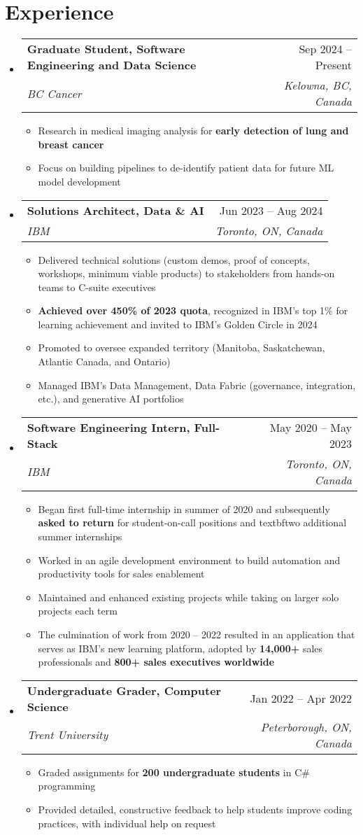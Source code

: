 \documentclass[letterpaper,11.5pt]{article}
\makeatletter
\newcommand{\resumeItem}[1]{
  \item\small{
    {#1 \vspace{-2pt}}
  }
}
\newcommand{\resumeSubheading}[4]{
  \vspace{-2pt}\item
    \begin{tabular*}{0.97\textwidth}[t]{l@{\extracolsep{\fill}}r}
      \textbf{#1} & #2 \\
      \textit{\small#3} & \textit{\small #4} \\
    \end{tabular*}\vspace{-7pt}
}
\newcommand{\resumeSubHeadingListStart}{\begin{itemize}[leftmargin=0.15in, label={}]}
\newcommand{\resumeSubHeadingListEnd}{\end{itemize}}
\newcommand{\resumeItemListStart}{\begin{itemize}}
\newcommand{\resumeItemListEnd}{\end{itemize}\vspace{-5pt}}
\makeatother
\begin{document}
\section{Experience}
  \resumeSubHeadingListStart
    \resumeSubheading
      {Graduate Student, Software Engineering and Data Science}{Sep 2024 -- Present}
      {BC Cancer}{Kelowna, BC, Canada}
      \resumeItemListStart
        \resumeItem{Research in medical imaging analysis for \textbf{early detection of lung and breast cancer}}
        \resumeItem{Focus on building pipelines to de-identify patient data for future ML model development}
      \resumeItemListEnd
    \resumeSubheading
      {Solutions Architect, Data \& AI}{Jun 2023 -- Aug 2024}
      {IBM}{Toronto, ON, Canada}
      \resumeItemListStart
        \resumeItem{Delivered technical solutions (custom demos, proof of concepts, workshops, minimum viable products) to stakeholders from hands-on teams to C-suite executives}
        \resumeItem{\textbf{Achieved over 450\% of 2023 quota}, recognized in IBM's top 1\% for learning achievement and invited to IBM's Golden Circle in 2024}
        \resumeItem{Promoted to oversee expanded territory (Manitoba, Saskatchewan, Atlantic Canada, and Ontario)}
        \resumeItem{Managed IBM's Data Management, Data Fabric (governance, integration, etc.), and generative AI portfolios}
      \resumeItemListEnd
    \resumeSubheading
      {Software Engineering Intern, Full-Stack}{May 2020 -- May 2023}
      {IBM}{Toronto, ON, Canada}
      \resumeItemListStart
        \resumeItem{Began first full-time internship in summer of 2020 and subsequently \textbf{asked to return} for student-on-call positions and textbf{two additional} summer internships}
        \resumeItem{Worked in an agile development environment to build automation and productivity tools for sales enablement}
        \resumeItem{Maintained and enhanced existing projects while taking on larger solo projects each term}
        \resumeItem{The culmination of work from 2020 -- 2022 resulted in an application that serves as IBM's new learning platform, adopted by \textbf{14,000+} sales professionals and \textbf{800+ sales executives worldwide}}
      \resumeItemListEnd
      \resumeSubheading
      {Undergraduate Grader, Computer Science}{Jan 2022 -- Apr 2022}
      {Trent University}{Peterborough, ON, Canada}
      \resumeItemListStart
        \resumeItem{Graded assignments for \textbf{200 undergraduate students} in C\# programming}
        \resumeItem{Provided detailed, constructive feedback to help students improve coding practices, with individual help on request}
      \resumeItemListEnd
  \resumeSubHeadingListEnd
\end{document}
